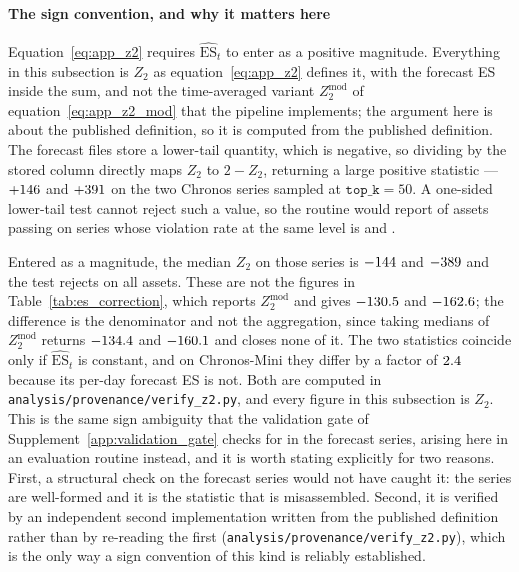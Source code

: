 \documentclass[preprint,11pt,authoryear]{elsarticle}
\newcommand{\ES}{\mathrm{ES}}
\newcommand{\1}{\boldsymbol{1}}
\begin{document}
\paragraph{The sign convention, and why it matters here}
Equation~\eqref{eq:app_z2} requires $\widehat{\ES}_t$ to enter as a positive
magnitude. Everything in this subsection is $Z_2$ as
equation~\eqref{eq:app_z2} defines it, with the forecast ES inside the sum, and
not the time-averaged variant $Z_2^{\mathrm{mod}}$ of
equation~\eqref{eq:app_z2_mod} that the pipeline implements; the argument here is
about the published definition, so it is computed from the published definition.
The forecast files store a lower-tail quantity, which is negative, so
dividing by the stored column directly maps $Z_2$ to $2 - Z_2$, returning a large
positive statistic --- $+146$ and $+391$ on the
two Chronos series sampled at $\texttt{top\_k} = 50$. A one-sided lower-tail test
cannot reject such a value, so the routine would report \nSupZTwoAssets{} of
\nSupZTwoAssets{} assets passing on series whose violation rate at the same level
is \nSupZTwoPiSmall{} and \nSupZTwoPiMini{}.

Entered as a magnitude, the median $Z_2$ on those series is
$-144$ and $-389$ and the test rejects on all
\nMainAssets{} assets. These are not the figures in
Table~\ref{tab:es_correction}, which reports $Z_2^{\mathrm{mod}}$ and gives
$-130.5$ and $-162.6$; the difference is the
denominator and not the aggregation, since taking medians of
$Z_2^{\mathrm{mod}}$ returns $-134.4$ and
$-160.1$ and closes none of it. The two statistics coincide only
if $\widehat{\ES}_t$ is constant, and on Chronos-Mini they differ by a factor of
$2.4$ because its per-day forecast ES is not. Both are computed in
\texttt{analysis/provenance/verify\_z2.py}, and every figure in this subsection
is $Z_2$. This is the same sign ambiguity
that the validation gate of Supplement~\ref{app:validation_gate} checks for in the
forecast series, arising here in an evaluation routine instead, and it is worth
stating explicitly for two reasons. First, a structural check on the forecast
series would not have caught it: the series are well-formed and it is the
statistic that is misassembled. Second, it is verified by an independent second
implementation written from the published definition rather than by re-reading
the first (\texttt{analysis/provenance/verify\_z2.py}), which is the only way a
sign convention of this kind is reliably established.
\end{document}
